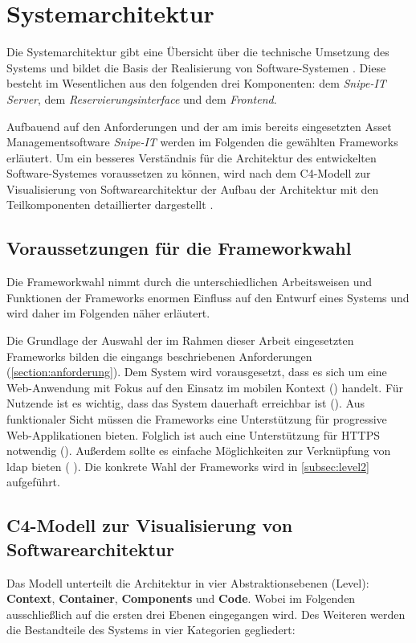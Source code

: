 \section{Systemarchitektur}
\label{section:architektur}
Die Systemarchitektur gibt eine Übersicht über die technische Umsetzung des
Systems und bildet die Basis der Realisierung von Software-Systemen
\cite{dumke_software-metriken_2000}. Diese besteht im Wesentlichen aus den
folgenden drei Komponenten: dem \textit{Snipe-IT Server}, dem
\textit{Reservierungsinterface} und dem \textit{Frontend}.

Aufbauend auf den Anforderungen und der am \ac{imis} bereits eingesetzten Asset Managementsoftware
\textit{Snipe-IT} werden im Folgenden die gewählten Frameworks erläutert. Um ein besseres
Verständnis für die Architektur des entwickelten Software-Systemes voraussetzen zu können, wird nach
dem C4-Modell zur Visualisierung von Softwarearchitektur der Aufbau der Architektur mit den
Teilkomponenten detaillierter dargestellt \cite{brown2013software}.

\subsection{Voraussetzungen für die Frameworkwahl}
\label{section:Frameworkwahl}
Die Frameworkwahl nimmt durch die unterschiedlichen Arbeitsweisen und Funktionen
der Frameworks enormen Einfluss auf den Entwurf eines Systems und wird daher im
Folgenden näher erläutert.

Die Grundlage der Auswahl der im Rahmen dieser Arbeit eingesetzten Frameworks bilden die eingangs
beschriebenen Anforderungen (\ref{section:anforderung}). Dem System wird vorausgesetzt, dass es sich
um eine Web-Anwendung mit Fokus auf den Einsatz im mobilen Kontext ()
handelt. Für Nutzende ist es wichtig, dass das System dauerhaft erreichbar ist (). Aus
funktionaler Sicht müssen die Frameworks eine Unterstützung für progressive Web-Applikationen
bieten. Folglich ist auch eine Unterstützung für HTTPS notwendig (). Außerdem sollte es
einfache Möglichkeiten zur Verknüpfung von \ac{ldap} bieten ( ). Die konkrete
Wahl der Frameworks wird in \ref{subsec:level2} aufgeführt.

\subsection{C4-Modell zur Visualisierung von Softwarearchitektur}
Das Modell unterteilt die Architektur in vier Abstraktionsebenen (Level):
\textbf{Context}, \textbf{Container}, \textbf{Components} und \textbf{Code}.
Wobei im Folgenden ausschließlich auf die ersten drei Ebenen eingegangen wird.
Des Weiteren werden die Bestandteile des Systems in vier Kategorien gegliedert:

